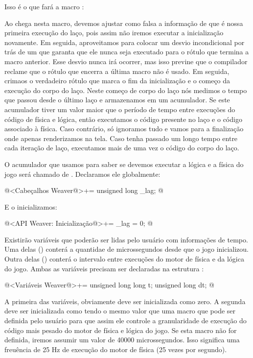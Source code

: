 Isso é o que fará a macro :

Ao chega nesta macro, devemos ajustar como falsa a informação de que é
nossa primeira execução do laço, pois assim não iremos executar a
inicialização novamente. Em seguida, aproveitamos para colocar um
desvio incondicional por trás de um  que garanta que
ele nunca seja executado para o rótulo que termina a macro
anterior. Esse desvio nunca irá ocorrer, mas isso previne que o
compilador reclame que o rótulo que encerra a última macro não é
usado. Em seguida, crimaos o verdadeiro rótulo que marca o fim da
inicialização e o começo da execução do corpo do laço. Neste começo de
corpo do laço nós medimos o tempo que passou desde o último laço e
armazenamos em um acumulador. Se este acumulador tiver um valor maior
que o período de tempo entre execuções do código de física e lógica,
então executamos o código presente no laço e o código associado à
física. Caso contrário, só ignoramos tudo e vamos para a finalização
onde apenas renderizamos na tela.  Caso tenha passado um longo tempo
entre cada iteração de laço, executamos mais de uma vez o código do
corpo do laço.

O acumulador que usamos para saber se devemos executar a lógica e a
física do jogo será chamado de . Declaramos ele
globalmente:

\iniciocodigo
@<Cabeçalhos Weaver@>+=
unsigned long _lag;
@
\fimcodigo

E o inicializamos:

@<API Weaver: Inicialização@>+=
_lag = 0;
@

Existirão variáveis que poderão ser lidas pelo usuário com informações
de tempo. Uma delas () conterá a quantidae de
microssegundos desde que o jogo inicializou. Outra delas
() conterá o intervalo entre execuções do motor de
física e da lógica do jogo. Ambas as variáveis precisam ser declaradas
na estrutura :

\iniciocodigo
@<Variáveis Weaver@>+=
unsigned long long t;
unsigned long dt;
@
\fimcodigo

A primeira das variáveis, obviamente deve ser inicializada como
zero. A segunda deve ser inicializada como tendo o mesmo valor que uma
macro  que pode ser definida pelo usuário para
que assim ele controle a granularidade de execução do código mais
pesado do motor de física e lógica do jogo. Se esta macro não for
definida, iremos assumir um valor de 40000 microssegundos. Isso
significa uma freuência de 25 Hz de execução do motor de física (25
vezes por segundo).

